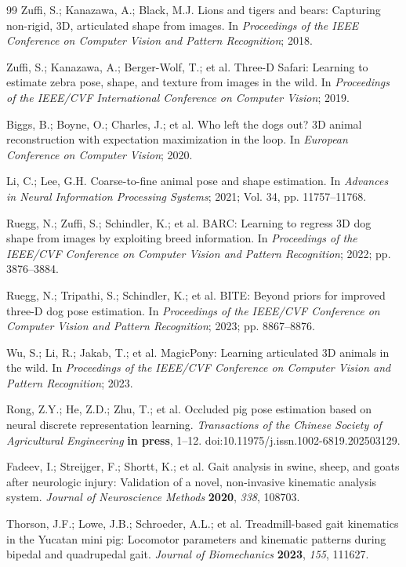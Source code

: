 \documentclass[computers,article,submit,pdftex,moreauthors]{mdpi}
\begin{document}
\begin{thebibliography}{99}
 Zuffi, S.; Kanazawa, A.; Black, M.J. Lions and tigers and bears: Capturing non-rigid, 3D, articulated shape from images. In \textit{Proceedings of the IEEE Conference on Computer Vision and Pattern Recognition}; 2018.

 Zuffi, S.; Kanazawa, A.; Berger-Wolf, T.; et al. Three-D Safari: Learning to estimate zebra pose, shape, and texture from images in the wild. In \textit{Proceedings of the IEEE/CVF International Conference on Computer Vision}; 2019.

 Biggs, B.; Boyne, O.; Charles, J.; et al. Who left the dogs out? 3D animal reconstruction with expectation maximization in the loop. In \textit{European Conference on Computer Vision}; 2020.

 Li, C.; Lee, G.H. Coarse-to-fine animal pose and shape estimation. In \textit{Advances in Neural Information Processing Systems}; 2021; Vol. 34, pp. 11757--11768.

 Ruegg, N.; Zuffi, S.; Schindler, K.; et al. BARC: Learning to regress 3D dog shape from images by exploiting breed information. In \textit{Proceedings of the IEEE/CVF Conference on Computer Vision and Pattern Recognition}; 2022; pp. 3876--3884.

 Ruegg, N.; Tripathi, S.; Schindler, K.; et al. BITE: Beyond priors for improved three-D dog pose estimation. In \textit{Proceedings of the IEEE/CVF Conference on Computer Vision and Pattern Recognition}; 2023; pp. 8867--8876.

 Wu, S.; Li, R.; Jakab, T.; et al. MagicPony: Learning articulated 3D animals in the wild. In \textit{Proceedings of the IEEE/CVF Conference on Computer Vision and Pattern Recognition}; 2023.

 Rong, Z.Y.; He, Z.D.; Zhu, T.; et al. Occluded pig pose estimation based on neural discrete representation learning. \textit{Transactions of the Chinese Society of Agricultural Engineering} \textbf{in press}, 1--12. doi:10.11975/j.issn.1002-6819.202503129.

 Fadeev, I.; Streijger, F.; Shortt, K.; et al. Gait analysis in swine, sheep, and goats after neurologic injury: Validation of a novel, non-invasive kinematic analysis system. \textit{Journal of Neuroscience Methods} \textbf{2020}, \textit{338}, 108703.

 Thorson, J.F.; Lowe, J.B.; Schroeder, A.L.; et al. Treadmill-based gait kinematics in the Yucatan mini pig: Locomotor parameters and kinematic patterns during bipedal and quadrupedal gait. \textit{Journal of Biomechanics} \textbf{2023}, \textit{155}, 111627.


\end{thebibliography}
\end{document}
